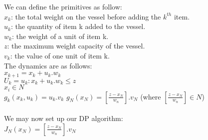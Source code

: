 \documentclass[11pt, english]{article}
\begin{document}
We can define the primitives as follow:\\
$x_k$: the total weight on the vessel before adding the $k^{th}$ item.\\
$u_k$: the quantity of item k added to the vessel.\\
$w_k$: the weight of a unit of item k.\\
$z$: the maximum weight capacity of the vessel.\\
$v_k$: the value of one unit of item k.
\\
The dynamics are as follows:\\
$x_{k+1} = x_k + u_k.w_k$\\
$U_k = {u_k: x_k + u_k.w_k \leq z}$\\
$x_i \in N$\\
$g_k(x_k, u_k) = u_k.v_k$
$g_N(x_N) =[\frac{z - x_N}{w_n}].v_N$ (where $[\frac{z - x_N}{w_n}] \in N$)\\
\\
We may now set up our DP algorithm:\\
$J_N(x_N) = [\frac{z - x_N}{w_n}].v_N$
\end{document}
